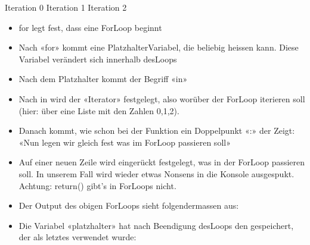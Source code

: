 \documentclass[letterpaper,10pt,english]{sphinxmanual}
\begin{document}
\begin{sphinxVerbatim}[commandchars=\\\{\}]
Iteration 0
Iteration 1
Iteration 2
\end{sphinxVerbatim}
\begin{itemize}
\item {} 
for legt fest, dass eine For\sphinxhyphen{}Loop beginnt

\item {} 
Nach «for» kommt eine Platzhalter\sphinxhyphen{}Variabel, die beliebig heissen kann. Diese Variabel verändert sich innerhalb des\sphinxhyphen{}Loops

\item {} 
Nach dem Platzhalter kommt der Begriff «in»

\item {} 
Nach in wird der «Iterator» festgelegt, also worüber der For\sphinxhyphen{}Loop iterieren soll (hier: über eine Liste mit den Zahlen 0,1,2).

\item {} 
Danach kommt, wie schon bei der Funktion ein Doppelpunkt «:» der Zeigt: «Nun legen wir gleich fest was im For\sphinxhyphen{}Loop passieren soll»

\item {} 
Auf einer neuen Zeile wird eingerückt festgelegt, was in der For\sphinxhyphen{}Loop passieren soll. In unserem Fall wird wieder etwas Nonsens in die Konsole ausgespukt. Achtung: return() gibt’s in For\sphinxhyphen{}Loops nicht.

\item {} 
Der Output des obigen For\sphinxhyphen{}Loops sieht folgendermassen aus:

\end{itemize}

\begin{sphinxVerbatim}[commandchars=\\\{\}]
 
 
 
\end{sphinxVerbatim}
\begin{itemize}
\item {} 
Die Variabel «platzhalter» hat nach Beendigung des\sphinxhyphen{}Loops den gespeichert, der als letztes verwendet wurde:

\end{itemize}

\begin{sphinxVerbatim}[commandchars=\\\{\}]
\end{sphinxVerbatim}
\end{document}
